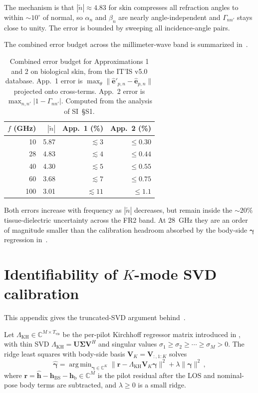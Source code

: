 \documentclass[journal,twocolumn,10pt]{IEEEtran}
\theoremstyle{plain}
\theoremstyle{definition}
\theoremstyle{remark}
\newcommand{\hh}{\bm{h}}
\newcommand{\gammab}{\bm{\gamma}}
\newcommand{\hBS}{\bm{h}_{\mathrm{BS}}}
\newcommand{\hbody}{\bm{h}_{\mathrm{b}}}
\newcommand{\Complex}{\mathbb{C}}
\newcommand{\ntilde}{\tilde{n}}
\DeclareMathOperator*{\argmin}{arg\,min}
\begin{document}
The mechanism is that $|\ntilde| \approx 4.83$ for skin compresses
all refraction angles to within $\sim\!10^{\circ}$ of normal, so
$\alpha_n$ and $\beta_n$ are nearly angle-independent and
$\Gamma_{nn'}$ stays close to unity. The error is bounded by
sweeping all incidence-angle pairs.

The combined error budget across the millimeter-wave band is
summarized in~.

\begin{table}[!htbp]
\centering
\caption{Combined error budget for Approximations 1 and 2 on
biological skin, from the IT'IS v5.0 database. App.~1 error is
$\max_\theta \|\hat{\bm{e}}'_{p,n} - \hat{\bm{e}}_{p,n}\|$ projected
onto cross-terms. App.~2 error is $\max_{n,n'}|1 - \Gamma_{nn'}|$.
Computed from the analysis of SI~\S{}S1.}
\label{tab:approx-acc}
\begin{tabular}{rrrr}
\toprule
$f$ (GHz) & $|\ntilde|$ & App.~1 (\%) & App.~2 (\%) \\
\midrule
10  & 5.87 & $\lesssim 3$  & $\leq 0.30$ \\
28  & 4.83 & $\lesssim 4$  & $\leq 0.44$ \\
40  & 4.30 & $\lesssim 5$  & $\leq 0.55$ \\
60  & 3.68 & $\lesssim 7$  & $\leq 0.75$ \\
100 & 3.01 & $\lesssim 11$ & $\leq 1.1$  \\
\bottomrule
\end{tabular}
\end{table}

Both errors increase with frequency as $|\ntilde|$ decreases, but
remain inside the $\sim\!20\%$ tissue-dielectric uncertainty across
the FR2 band. At 28~GHz they are an order of magnitude smaller than
the calibration headroom absorbed by the body-side $\gammab$
regression in~.

\section{Identifiability of \texorpdfstring{$K$}{K}-mode SVD calibration}
\label{app:ident}

This appendix gives the truncated-SVD argument behind~.

Let $\Lambda_{\mathrm{KH}} \in \Complex^{M \times T_{\mathrm{vis}}}$
be the per-pilot Kirchhoff regressor matrix introduced in
, with thin SVD
$\Lambda_{\mathrm{KH}} = \bm{U}\bm{\Sigma}\bm{V}^{\!H}$ and singular
values $\sigma_1 \geq \sigma_2 \geq \cdots \geq \sigma_M > 0$. The
ridge least squares with body-side basis
$\bm{V}_K = \bm{V}_{:,1:K}$ solves
\begin{equation}\label{eq:gamma-ridge}
  \hat{\gammab} = \argmin_{\gammab \in \Complex^K}
    \bigl\|\bm{r} - \Lambda_{\mathrm{KH}}\bm{V}_K\gammab\bigr\|^2
  + \lambda \|\gammab\|^2\,,
\end{equation}
where $\bm{r} = \hat{\hh} - \hBS - \hbody \in \Complex^M$ is the
pilot residual after the LOS and nominal-pose body terms are
subtracted, and $\lambda \geq 0$ is a small ridge.
\end{document}
